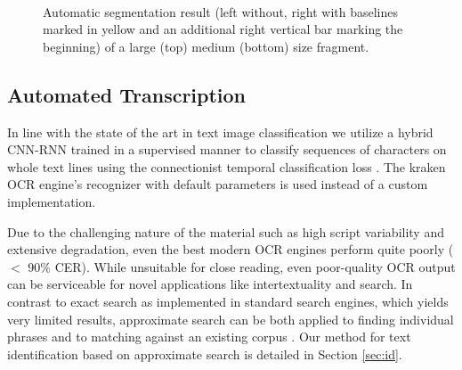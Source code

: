 \begin{figure}[t]
	\\ 

	\caption{Automatic segmentation result (left without, right with
	baselines marked in yellow and an additional right vertical bar marking
	the beginning) of a large (top) medium (bottom) size fragment.}
\vspace*{-5mm} \label{fig:algn_baselinesegm} \end{figure}

\subsection{Automated Transcription}

In line with the state of the art in text image classification we utilize a
hybrid CNN-RNN trained in a supervised manner to classify sequences of
characters on whole text lines using the connectionist temporal classification
loss \cite{graves2006connectionist}. The kraken OCR engine's recognizer with
default parameters is used instead of a custom implementation.

Due to the challenging nature of the material such as high script variability
and extensive degradation, even the best modern OCR engines perform quite
poorly ($<$ 90\% CER). While unsuitable for close reading, even poor-quality
OCR output can be serviceable for novel applications like intertextuality and
search.  In contrast to exact search as implemented in standard search engines,
which yields very limited results, approximate search can be both applied to
finding individual phrases \cite{approx,Wiener} and to matching against an
existing corpus \cite{Zh}.  Our method for text identification based on
approximate search is detailed in Section \ref{sec:id}.

